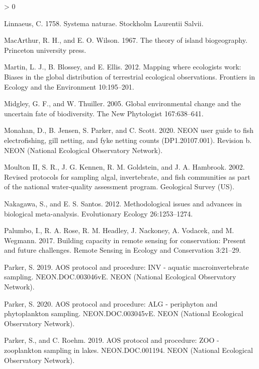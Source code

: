 \documentclass[
  12pt,
]{article}
\newlength{\cslhangindent}
\newenvironment{CSLReferences}[2] %
 {%
  \setlength{\parindent}{0pt}
  \ifodd #1 \everypar{\setlength{\hangindent}{\cslhangindent}}\ignorespaces\fi
  \ifnum #2 > 0
  \setlength{\parskip}{#2\baselineskip}
  \fi
 }%
 {}
\begin{document}
\begin{CSLReferences}{1}{0}
\leavevmode\hypertarget{ref-linnaeus1758systema}{}%
Linnaeus, C. 1758. Systema naturae. Stockholm Laurentii Salvii.

\leavevmode\hypertarget{ref-macarthur1967theory}{}%
MacArthur, R. H., and E. O. Wilson. 1967. The theory of island biogeography. Princeton university press.

\leavevmode\hypertarget{ref-martin2012mapping}{}%
Martin, L. J., B. Blossey, and E. Ellis. 2012. Mapping where ecologists work: Biases in the global distribution of terrestrial ecological observations. Frontiers in Ecology and the Environment 10:195--201.

\leavevmode\hypertarget{ref-midgley2005global}{}%
Midgley, G. F., and W. Thuiller. 2005. Global environmental change and the uncertain fate of biodiversity. The New Phytologist 167:638--641.

\leavevmode\hypertarget{ref-Monahan2020}{}%
Monahan, D., B. Jensen, S. Parker, and C. Scott. 2020. NEON user guide to fish electrofishing, gill netting, and fyke netting counts (DP1.20107.001). Revision b. NEON (National Ecological Observatory Network).

\leavevmode\hypertarget{ref-moulton2002revised}{}%
Moulton II, S. R., J. G. Kennen, R. M. Goldstein, and J. A. Hambrook. 2002. Revised protocols for sampling algal, invertebrate, and fish communities as part of the national water-quality assessment program. Geological Survey (US).

\leavevmode\hypertarget{ref-nakagawa2012methodological}{}%
Nakagawa, S., and E. S. Santos. 2012. Methodological issues and advances in biological meta-analysis. Evolutionary Ecology 26:1253--1274.

\leavevmode\hypertarget{ref-palumbo2017building}{}%
Palumbo, I., R. A. Rose, R. M. Headley, J. Nackoney, A. Vodacek, and M. Wegmann. 2017. Building capacity in remote sensing for conservation: Present and future challenges. Remote Sensing in Ecology and Conservation 3:21--29.

\leavevmode\hypertarget{ref-Parker2019}{}%
Parker, S. 2019. AOS protocol and procedure: INV - aquatic macroinvertebrate sampling. NEON.DOC.003046vE. NEON (National Ecological Observatory Network).

\leavevmode\hypertarget{ref-Parker2020}{}%
Parker, S. 2020. AOS protocol and procedure: ALG - periphyton and phytoplankton sampling. NEON.DOC.003045vE. NEON (National Ecological Observatory Network).

\leavevmode\hypertarget{ref-ParkerRoehm2019}{}%
Parker, S., and C. Roehm. 2019. AOS protocol and procedure: ZOO - zooplankton sampling in lakes. NEON.DOC.001194. NEON (National Ecological Observatory Network).


\end{CSLReferences}
\end{document}
